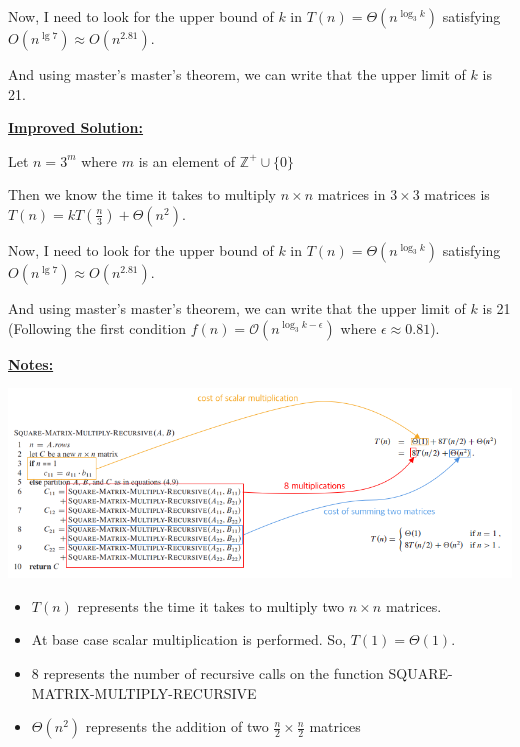 \documentclass[12pt]{article}
\begin{document}
\begin{enumerate}[1.]
    \bigskip

    Now, I need to look for the upper bound of $k$ in $T(n) = \Theta(n^{\log_3 k} )$ satisfying $O(n^{\lg 7}) \approx O (n^{2.81})$.

    \bigskip

    And using master's master's theorem, we can write that the upper limit of $k$ is 21.

    \bigskip

    \begin{mdframed}
        \underline{\textbf{Improved Solution:}}

        Let $n = 3^m$ where $m$ is an element of $\mathbb{Z}^+ \cup \{0\}$

        \bigskip

        Then we know the time it takes to multiply $n \times n$ matrices in $3 \times 3$
        matrices is $T(n) = k T(\frac{n}{3}) + \Theta(n^2)$.

        \bigskip

        Now, I need to look for the upper bound of $k$ in $T(n) = \Theta(n^{\log_3 k} )$ satisfying $O(n^{\lg 7}) \approx O (n^{2.81})$.

        \bigskip

        And using master's master's theorem, we can write that the upper limit of $k$ is 21 \color{red}(Following
        the first condition $f(n) = \mathcal{O}(n^{\log_3 k - \epsilon} )$ where $\epsilon \approx 0.81$)\color{black}.

    \end{mdframed}

    \underline{\textbf{Notes:}}

    \bigskip

    \begin{center}
    \includegraphics[width=\linewidth]{images/worksheet_1_solution_2.png}
    \end{center}

    \bigskip

    \begin{itemize}
        \item $T(n)$ represents the time it takes to multiply two $n \times n$ matrices.
        \item At base case scalar multiplication is performed. So, $T(1) = \Theta(1)$.
        \item $8$ represents the number of recursive calls on the function SQUARE-MATRIX-MULTIPLY-RECURSIVE
        \item $\Theta(n^2)$ represents the addition of two $\frac{n}{2} \times \frac{n}{2}$ matrices
    \end{itemize}


\end{enumerate}
\end{document}
